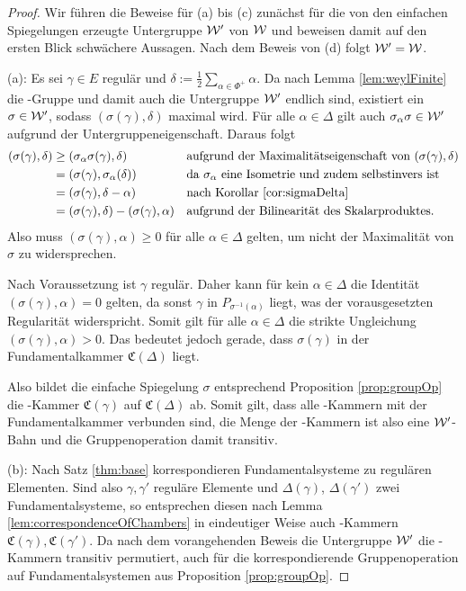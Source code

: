 \begin{proof}
  Wir führen die Beweise für (a) bis (c) zunächst für die von den einfachen Spiegelungen erzeugte Untergruppe $\mathcal{W}'$ von $\mathcal{W}$ und beweisen damit auf den ersten Blick schwächere Aussagen.
  Nach dem Beweis von (d) folgt $\mathcal{W}' = \mathcal{W}$.

  (a):
  Es sei $\gamma \in E$ regulär und $\delta := \tfrac{1}{2} \sum_{\alpha \in \Phi^+} \alpha$.
  Da nach Lemma \ref{lem:weylFinite} die \weyl\hyp{}Gruppe und damit auch die Untergruppe $\mathcal{W}'$ endlich sind, existiert ein $\sigma \in \mathcal{W}'$, sodass $(\sigma(\gamma), \delta)$ maximal wird.
  Für alle $\alpha \in \Delta$ gilt auch $\sigma_\alpha\sigma \in \mathcal{W}'$ aufgrund der Untergruppeneigenschaft.
  Daraus folgt
  \begin{align*}
    (\sigma(\gamma), \delta) 
    &\geq (\sigma_\alpha \sigma(\gamma), \delta) &&\text{aufgrund der Maximalitätseigenschaft von $(\sigma(\gamma),\delta)$} \\
    &= (\sigma(\gamma), \sigma_\alpha(\delta)) &&\text{da $\sigma_\alpha$ eine Isometrie und zudem selbstinvers ist} \\
    &= (\sigma(\gamma), \delta - \alpha) &&\text{nach Korollar \ref{cor:sigmaDelta}} \\
    &= (\sigma(\gamma), \delta) - (\sigma(\gamma), \alpha) &&\text{aufgrund der Bilinearität des Skalarproduktes.}
  \end{align*}
  Also muss $(\sigma(\gamma), \alpha) \geq 0$ für alle $\alpha \in \Delta$ gelten, um nicht der Maximalität von $\sigma$ zu widersprechen.

  Nach Voraussetzung ist $\gamma$ regulär.
  Daher kann für kein $\alpha \in \Delta$ die Identität $(\sigma(\gamma),\alpha) = 0$ gelten, da sonst $\gamma$ in $P_{\sigma^{-1}(\alpha)}$ liegt, was der vorausgesetzten Regularität widerspricht.
  Somit gilt für alle $\alpha \in \Delta$ die strikte Ungleichung $(\sigma(\gamma), \alpha) > 0$.
  Das bedeutet jedoch gerade, dass $\sigma(\gamma)$ in der Fundamentalkammer $\mathfrak{C}(\Delta)$ liegt.

  Also bildet die einfache Spiegelung $\sigma$ entsprechend Proposition \ref{prop:groupOp} die \weyl\hyp{}Kammer $\mathfrak{C}(\gamma)$ auf $\mathfrak{C}(\Delta)$ ab. 
  Somit gilt, dass alle \weyl\hyp{}Kammern mit der Fundamentalkammer verbunden sind, die Menge der \weyl\hyp{}Kammern ist also eine $\mathcal{W}'$\hyp{}Bahn und die Gruppenoperation damit transitiv.

  (b):
  Nach Satz \ref{thm:base} korrespondieren Fundamentalsysteme zu regulären Elementen.
  Sind also $\gamma, \gamma'$ reguläre Elemente und $\Delta(\gamma)$, $\Delta(\gamma')$ zwei Fundamentalsysteme, so entsprechen diesen nach Lemma \ref{lem:correspondenceOfChambers} in eindeutiger Weise auch \weyl\hyp{}Kammern $\mathfrak{C}(\gamma), \mathfrak{C}(\gamma')$.
  Da nach dem vorangehenden Beweis die Untergruppe $\mathcal{W}'$ die \weyl\hyp{}Kammern transitiv permutiert, auch für die korrespondierende Gruppenoperation auf Fundamentalsystemen aus Proposition \ref{prop:groupOp}.
  

\end{proof}
